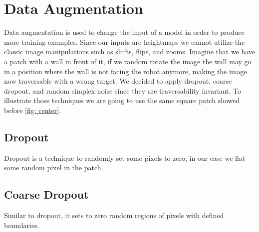 \documentclass[../document.tex]{subfiles}
\begin{document}
\section{Data Augmentation}
\label{sec: data-aug}
Data augmentation is used to change the input of a model in order to produce more training examples. Since our inputs are heightmaps we cannot utilize the classic image manipulations such as shifts, flips, and zooms. Imagine that we have a patch with a wall in front of it, if we random rotate the image the wall may go in a position where the wall is not facing the robot anymore, making the image now traversable with a wrong target. We decided to apply dropout, coarse dropout, and random simplex noise since they are traversability invariant. To illustrate those techniques we are going to use the same square patch showed before \ref{fig: center}.

\subsection{Dropout}
Dropout is a technique to randomly set some pixels to zero, in our case we flat some random pixel in the patch. 
\subsection{Coarse Dropout}
Similar to dropout, it sets to zero random regions of pixels with defined boundaries. 
\end{document}
